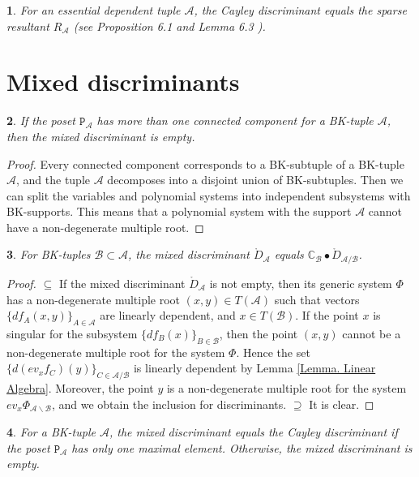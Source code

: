 \documentclass[11pt]{article}
\theoremstyle{plain}
\newtheorem{thm}{\protect\theoremname}[section]
\theoremstyle{definition}
\theoremstyle{remark}
\theoremstyle{plain}
\newtheorem{lem}[thm]{\protect\lemmaname}
\theoremstyle{plain}
\theoremstyle{plain}
\newtheorem{cor}[thm]{\protect\corollaryname}
\theoremstyle{definition}
\providecommand{\corollaryname}{Corollary}
\providecommand{\lemmaname}{Lemma}
\providecommand{\theoremname}{Theorem}
\begin{document}
\begin{cor}
\label{Corollary. Cayley discriminant for an essential linearly dependent tuple}For
an essential dependent tuple $\mathscr{A}$, the Cayley discriminant
equals the sparse resultant $R_{\mathscr{A}}$ \textup{(see Proposition
6.1 and Lemma 6.3 \cite{dickenstein_tropical_2007})}.
\end{cor}


\section{\label{Section. Mixed discriminants}Mixed discriminants}
\begin{lem}
\label{Lemma. Mixed discriminant for a connected component of the poset}If
the poset $\mathtt{P}_{\mathscr{A}}$ has more than one connected
component for a BK-tuple $\mathscr{A}$, then the mixed discriminant
is empty.
\end{lem}

\begin{proof}
Every connected component corresponds to a BK-subtuple of a BK-tuple
$\mathscr{A}$, and the tuple $\mathscr{A}$ decomposes into a disjoint
union of BK-subtuples. Then we can split the variables and polynomial
systems into independent subsystems with BK-supports. This means that
a polynomial system with the support $\mathscr{A}$ cannot have a
non-degenerate multiple root.
\end{proof}
\begin{lem}
\label{Lemma. Simplification of a mixed discriminant}For BK-tuples
$\mathscr{B}\subset\mathscr{A}$, the mixed discriminant $\mathring{D}_{\mathscr{A}}$
equals $\mathbb{C}_{\mathscr{B}}\bullet\mathring{D}_{\mathscr{A}/\mathscr{B}}$.
\end{lem}

\begin{proof}
$\boxed{\subseteq}$ If the mixed discriminant $\mathring{D}_{\mathscr{A}}$
is not empty, then its generic system $\Phi$ has a non-degenerate
multiple root $(x,y)\in T(\mathscr{A})$ such that vectors $\{df_{A}(x,y)\}_{A\in\mathscr{A}}$
are linearly dependent, and $x\in T(\mathscr{B})$. If the point $x$
is singular for the subsystem $\{df_{B}(x)\}_{B\in\mathscr{B}}$,
then the point $(x,y)$ cannot be a non-degenerate multiple root for
the system $\Phi$. Hence the set $\{d(ev_{x}f_{C})(y)\}_{C\in\mathscr{A}/\mathscr{B}}$
is linearly dependent by Lemma \ref{Lemma. Linear Algebra}. Moreover,
the point $y$ is a non-degenerate multiple root for the system $ev_{x}\Phi_{\mathscr{A}\backslash\mathscr{B}}$,
and we obtain the inclusion for discriminants. $\boxed{\supseteq}$
It is clear. 
\end{proof}
\begin{thm}
\label{Theorem. The mixed discriminant for a BK-tuple}For a BK-tuple
$\mathscr{A}$, the mixed discriminant equals the Cayley discriminant
if the poset $\mathtt{P}_{\mathscr{A}}$ has only one maximal element.
Otherwise, the mixed discriminant is empty.
\end{thm}
\end{document}
